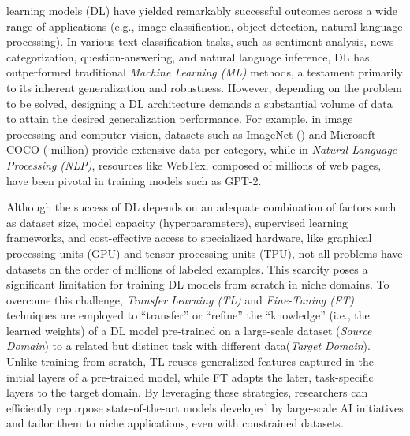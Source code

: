 \documentclass[onecolumn, journal, english, 12pt, a4paper]{IEEEtran} %
\theoremstyle{definition}
\begin{document}
 learning models (DL) have yielded remarkably
successful outcomes across a wide range of applications (e.g., image
classification, object detection, natural language
processing)\cite{PATHAK20181706}. In various text classification
tasks, such as sentiment analysis, news categorization,
question-answering, and natural language inference, DL has outperformed
traditional \emph{Machine Learning (ML)}  methods\cite{Minaee2021}, a
testament primarily to its inherent generalization and
robustness\cite{Zahangir2018}. However, depending on the problem
to be solved, designing a DL architecture demands a substantial volume
of data to attain the desired generalization performance. For example,
in image processing and computer vision, datasets such as ImageNet
() and Microsoft COCO ( million)
provide extensive data per category\cite{PATHAK20181706}, while in
\emph{Natural Language Processing (NLP)}, resources like WebTex, composed of
millions of web pages, have been pivotal in training models such as
GPT-2\cite{radford2019language}.


Although the success of DL depends on an adequate combination of
factors such as dataset size, model capacity (hyperparameters),
supervised learning frameworks, and cost-effective access to
specialized hardware, like graphical processing units (GPU) and tensor
processing units (TPU)\cite{radford2019language,
  murphy2022probabilistic}, not all problems have datasets on the
order of millions of labeled examples. This scarcity poses a
significant limitation for training DL models from scratch in niche
domains. To overcome this challenge, \emph{Transfer Learning (TL)} and
\emph{Fine-Tuning (FT)} techniques are employed to \enquote{transfer}
or \enquote{refine} the \enquote{knowledge} (i.e., the learned
weights) of a DL model pre-trained on a large-scale dataset
(\textit{Source Domain}) to a related but distinct task with different
data(\textit{Target Domain}). Unlike training from scratch, TL reuses
generalized features captured in the initial layers of a pre-trained
model, while FT adapts the later, task-specific layers to the target
domain\cite{yosinski2014transferable}\cite{howard2018universallanguagemodelfinetuning}. By
leveraging these strategies, researchers can efficiently repurpose
state-of-the-art models developed by large-scale AI initiatives and
tailor them to niche applications, even with constrained datasets.
\end{document}
